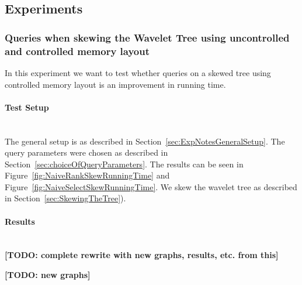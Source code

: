 \subsection{Experiments}

\subsubsection{Queries when skewing the Wavelet Tree using uncontrolled and controlled memory layout}
In this experiment we want to test whether queries on a skewed tree using controlled memory layout is an improvement in running time.

\paragraph{Test Setup}~\\
The general setup is as described in Section~\ref{sec:ExpNotesGeneralSetup}.
The query parameters were chosen as described in Section~\ref{sec:choiceOfQueryParameters}.
The results can be seen in Figure~\ref{fig:NaiveRankSkewRunningTime} and Figure~\ref{fig:NaiveSelectSkewRunningTime}.
We skew the wavelet tree as described in Section~\ref{sec:SkewingTheTree}).

\paragraph{Results}~\\
\textbf{[TODO: complete rewrite with new graphs, results, etc. from this]}


\textbf{[TODO: new graphs]}

\iffalse
{}

